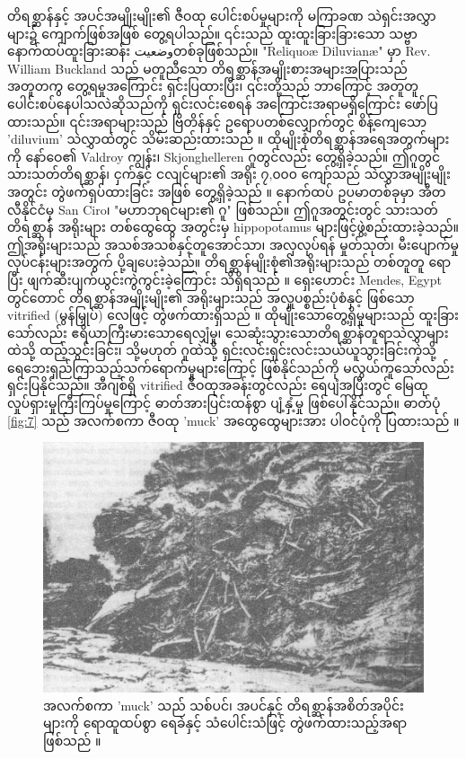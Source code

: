 \documentclass[10pt,twocolumn,letterpaper]{article}
\begin{document}
တိရစ္ဆာန်နှင့် အပင်အမျိုးမျိုး၏ ဇီဝထု ပေါင်းစပ်မှုများကို မကြာခဏ သဲရှင်းအလွှာများ၌ ကျောက်ဖြစ်အဖြစ် တွေ့ရပါသည်။ ၎င်းသည် ထူးထူးခြားခြားသော သဗ္ဗာ နောက်ထပ်ထူးခြားဆန်း وضعیتတစ်ခုဖြစ်သည်။ "Reliquoæ Diluvianæ" မှာ Rev. William Buckland သည် မတူညီသော တိရစ္ဆာန်အမျိုးစားအများအပြားသည် အတူတကွ တွေ့ရမှုအကြောင်း ရှင်းပြထားပြီး၊ ၎င်းတို့သည် ဘာကြောင့် အတူတူ ပေါင်းစပ်နေပါသလဲဆိုသည်ကို ရှင်းလင်းစေရန် အကြောင်းအရာမရှိကြောင်း ဖော်ပြထားသည်။ ၎င်းအရာများသည် ဗြိတိန်နှင့် ဥရောပတစ်လျှောက်တွင် စိန့်ကျေသော 'diluvium' သဲလွှာထဲတွင် သိမ်းဆည်းထားသည် \cite{58}။ ထိုမျိုးစုံတိရစ္ဆာန်အရေအတွက်များကို နော်ဝေ၏ Valdroy ကျွန်း၊ Skjonghelleren ဂူတွင်လည်း တွေ့ရှိခဲ့သည်။ ဤဂူတွင် သားသတ်တိရစ္ဆာန်၊ ငှက်နှင့် ငလျင်များ၏ အရိုး ၇,၀၀၀ ကျော်သည် သဲလွှာအမျိုးမျိုးအတွင်း တွဲဖက်ရှပ်ထားခြင်း အဖြစ် တွေ့ရှိခဲ့သည် \cite{59}။ နောက်ထပ် ဥပမာတစ်ခုမှာ အီတလီနိုင်ငံမှ San Ciro၊ "မဟာဘုရင်များ၏ ဂူ" ဖြစ်သည်။ ဤဂူအတွင်းတွင် သားသတ်တိရစ္ဆာန် အရိုးများ တစ်ထွေထွေ အတွင်းမှ hippopotamus များဖြင့်ဖွဲ့စည်းထားခဲ့သည်။ ဤအရိုးများသည် အသစ်အသစ်နှင့်တူအောင်သာ၊ အလှလုပ်ရန် မှုတ်သုတ်၊ မီးပျောက်မှုလုပ်ငန်းများအတွက် ပို့ချပေးခဲ့သည်။ တိရစ္ဆာန်မျိုးစုံ၏အရိုးများသည် တစ်တူတူ ရောပြီး ဖျက်ဆီးပျက်ယွင်းကွဲကွင်းခဲ့ကြောင်း သိရှိရသည် \cite{60,61}။ ရှေးဟောင်း Mendes, Egypt တွင်တောင် တိရစ္ဆာန်အမျိုးမျိုး၏ အရိုးများသည် အလှူပစ္စည်းပုံစံနှင့် ဖြစ်သော vitrified (မွန်မြှုပ်) လေဖြင့် တွဲဖက်ထားရှိသည် \cite{57}။  ထိုမျိုးသောတွေ့ရှိမှုများသည် ထူးခြားသော်လည်း ဧရိယာကြီးမားသောရေလျှံမှု၊ သေဆုံးသွားသောတိရစ္ဆာန်တူရာသဲလွှာများထဲသို့ ထည့်သွင်းခြင်း၊ သို့မဟုတ် ဂူထဲသို့ ရှင်းလင်းရှင်းလင်းသယ်ယူသွားခြင်းကဲ့သို့ ရေဘေးရှည်ကြာသည့်သက်ရောက်မှုများကြောင့် ဖြစ်နိုင်သည်ကို မလွယ်ကူသော်လည်း ရှင်းပြနိုင်သည်။ အီဂျစ်ရှိ vitrified ဇီဝထုအခန်းတွင်လည်း ရေပျံအပြီးတွင် မြေထုလှုပ်ရှားမှုကြီးကြပ်မှုကြောင့် ဓာတ်အားပြင်းထန်စွာ ပျံ့နှံ့မှု ဖြစ်ပေါ်နိုင်သည်။ ဓာတ်ပုံ \ref{fig:7} သည် အလက်စကာ ဇီဝထု 'muck' အထွေထွေများအား ပါဝင်ပုံကို ပြထားသည် \cite{56}။

\begin{figure}[t]
\begin{center}
   \includegraphics[width=1\linewidth]{muck-crop.jpeg}
\end{center}
   \caption{အလက်စကာ 'muck' သည် သစ်ပင်၊ အပင်နှင့် တိရစ္ဆာန်အစိတ်အပိုင်းများကို ရောထူထပ်စွာ ရေခဲနှင့် သံပေါင်းသံဖြင့် တွဲဖက်ထားသည့်အရာ ဖြစ်သည် \cite{146}။}
\label{fig:7}
\label{fig:onecol}
\end{figure}
\end{document}
